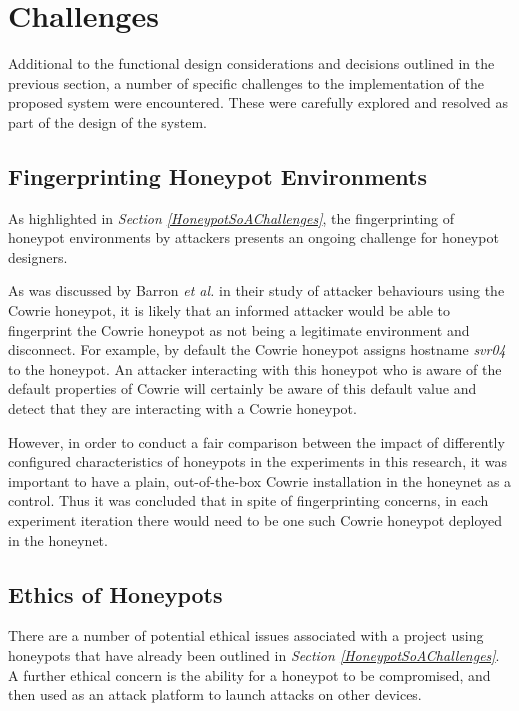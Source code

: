 %
%


	\section{Challenges} \label{DesignChallenges}
    Additional to the functional design considerations and decisions outlined in the previous section, a number of specific challenges to the implementation of the proposed system were encountered. These were carefully explored and resolved as part of the design of the system.
    
    \subsection{Fingerprinting Honeypot Environments} \label{ChallengeHoneypotFingerprinting}
    As highlighted in \textit{Section \ref{HoneypotSoAChallenges}}, the fingerprinting of honeypot environments by attackers presents an ongoing challenge for honeypot designers. 
        
As was discussed by Barron \textit{et al.} in their study of attacker behaviours using the Cowrie honeypot, it is likely that an informed attacker would be able to fingerprint the Cowrie honeypot as not being a legitimate environment and disconnect. \cite{PickyAttackers2017} For example, by default the Cowrie honeypot assigns hostname \textit{svr04} to the honeypot. An attacker interacting with this honeypot who is aware of the default properties of Cowrie will certainly be aware of this default value and detect that they are interacting with a Cowrie honeypot.

However, in order to conduct a fair comparison between the impact of differently configured characteristics of honeypots in the experiments in this research, it was important to have a plain, out-of-the-box Cowrie installation in the honeynet as a control. Thus it was concluded that in spite of fingerprinting concerns, in each experiment iteration there would need to be one such Cowrie honeypot deployed in the honeynet.
    
    	\subsection{Ethics of Honeypots} \label{EthicsOfHoneypots}
		There are a number of potential ethical issues associated with a project using honeypots that have already been outlined in \textit{Section \ref{HoneypotSoAChallenges}}. A further ethical concern is the ability for a honeypot to be compromised, and then used as an attack platform to launch attacks on other devices. 
  
